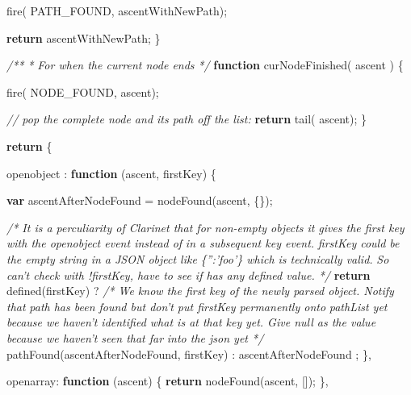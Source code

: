 \documentclass[]{article}
\newenvironment{Shaded}{}{}
\newcommand{\KeywordTok}[1]{\textcolor[rgb]{0.00,0.44,0.13}{\textbf{{#1}}}}
\newcommand{\DataTypeTok}[1]{\textcolor[rgb]{0.56,0.13,0.00}{{#1}}}
\newcommand{\CommentTok}[1]{\textcolor[rgb]{0.38,0.63,0.69}{\textit{{#1}}}}
\newcommand{\FunctionTok}[1]{\textcolor[rgb]{0.02,0.16,0.49}{{#1}}}
\newcommand{\NormalTok}[1]{{#1}}
\begin{document}
\begin{Shaded}
\begin{Highlighting}[]
      \FunctionTok{fire}\NormalTok{( PATH_FOUND, ascentWithNewPath);}
 
      \KeywordTok{return} \NormalTok{ascentWithNewPath;}
   \NormalTok{\}}


   \CommentTok{/**}
\CommentTok{    * For when the current node ends}
\CommentTok{    */}
   \KeywordTok{function} \FunctionTok{curNodeFinished}\NormalTok{( ascent ) \{}

      \FunctionTok{fire}\NormalTok{( NODE_FOUND, ascent);}
                          
      \CommentTok{// pop the complete node and its path off the list:                                    }
      \KeywordTok{return} \FunctionTok{tail}\NormalTok{( ascent);}
   \NormalTok{\}      }
                 
   \KeywordTok{return} \NormalTok{\{ }

      \DataTypeTok{openobject }\NormalTok{: }\KeywordTok{function} \NormalTok{(ascent, firstKey) \{}

         \KeywordTok{var} \NormalTok{ascentAfterNodeFound = }\FunctionTok{nodeFound}\NormalTok{(ascent, \{\});         }

         \CommentTok{/* It is a perculiarity of Clarinet that for non-empty objects it}
\CommentTok{            gives the first key with the openobject event instead of}
\CommentTok{            in a subsequent key event.}
\CommentTok{                      }
\CommentTok{            firstKey could be the empty string in a JSON object like }
\CommentTok{            \{'':'foo'\} which is technically valid.}
\CommentTok{            }
\CommentTok{            So can't check with !firstKey, have to see if has any }
\CommentTok{            defined value. */}
         \KeywordTok{return} \FunctionTok{defined}\NormalTok{(firstKey)}
         \NormalTok{?          }
            \CommentTok{/* We know the first key of the newly parsed object. Notify that }
\CommentTok{               path has been found but don't put firstKey permanently onto }
\CommentTok{               pathList yet because we haven't identified what is at that key }
\CommentTok{               yet. Give null as the value because we haven't seen that far }
\CommentTok{               into the json yet */}
            \FunctionTok{pathFound}\NormalTok{(ascentAfterNodeFound, firstKey)}
         \NormalTok{:}
            \NormalTok{ascentAfterNodeFound}
         \NormalTok{;}
      \NormalTok{\},}
    
      \DataTypeTok{openarray}\NormalTok{: }\KeywordTok{function} \NormalTok{(ascent) \{}
         \KeywordTok{return} \FunctionTok{nodeFound}\NormalTok{(ascent, []);}
      \NormalTok{\},}


\end{Highlighting}
\end{Shaded}
\end{document}

